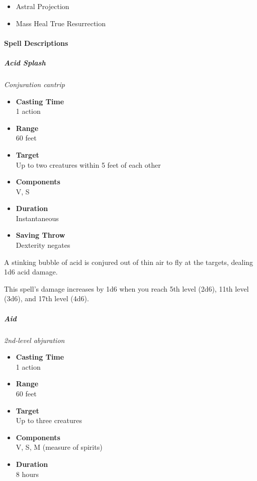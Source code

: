 \begin{itemize}
\item
  Astral Projection
\item
  Mass Heal True Resurrection
\end{itemize}

\paragraph{Spell
Descriptions}\label{All_Spell_Descriptions_spell-descriptions}

\subparagraph{Acid Splash}\label{Spell_Acid_Splash_acid-splash}

\emph{Conjuration cantrip}

\begin{itemize}
\item
  \textbf{Casting Time}\\
  1 action
\item
  \textbf{Range}\\
  60 feet
\item
  \textbf{Target}\\
  Up to two creatures within 5 feet of each other
\item
  \textbf{Components}\\
  V, S
\item
  \textbf{Duration}\\
  Instantaneous
\item
  \textbf{Saving Throw}\\
  Dexterity negates
\end{itemize}

A stinking bubble of acid is conjured out of thin air to fly at the
targets, dealing 1d6 acid damage.

This spell's damage increases by 1d6 when you reach 5th level (2d6),
11th level (3d6), and 17th level (4d6).

\subparagraph{Aid}\label{Spell_Aid_aid}

\emph{2nd-level abjuration}

\begin{itemize}
\item
  \textbf{Casting Time}\\
  1 action
\item
  \textbf{Range}\\
  60 feet
\item
  \textbf{Target}\\
  Up to three creatures
\item
  \textbf{Components}\\
  V, S, M (measure of spirits)
\item
  \textbf{Duration}\\
  8 hours
\end{itemize}

